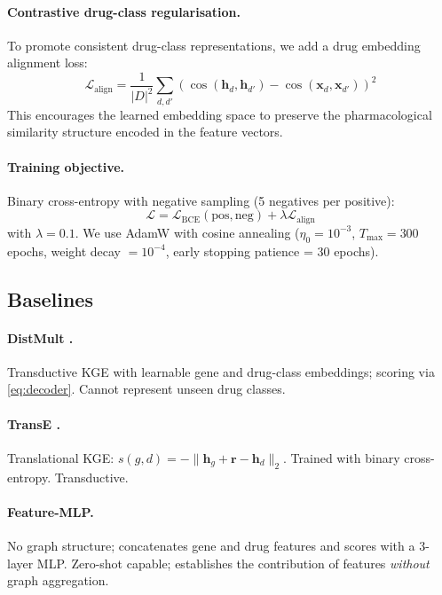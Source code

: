 \documentclass[conference]{IEEEtran}
\begin{document}
\paragraph{Contrastive drug-class regularisation.}
To promote consistent drug-class representations, we add a drug
embedding alignment loss:
\begin{equation}
  \mathcal{L}_{\text{align}} = \frac{1}{|D|^2}
  \sum_{d,d'} \!\left(\cos(\mathbf{h}_d, \mathbf{h}_{d'}) -
    \cos(\mathbf{x}_d, \mathbf{x}_{d'})\right)^2
  \label{eq:align}
\end{equation}
This encourages the learned embedding space to preserve the
pharmacological similarity structure encoded in the feature vectors.

\paragraph{Training objective.}
Binary cross-entropy with negative sampling (5 negatives per positive):
\begin{equation}
  \mathcal{L} = \mathcal{L}_{\text{BCE}}(\text{pos}, \text{neg})
              + \lambda \mathcal{L}_{\text{align}}
\end{equation}
with $\lambda = 0.1$. We use AdamW with cosine annealing
($\eta_0 = 10^{-3}$, $T_{\max} = 300$ epochs, weight decay $= 10^{-4}$,
early stopping patience = 30 epochs).

\subsection{Baselines}

\paragraph{DistMult \cite{Yang2015distmult}.}
Transductive KGE with learnable gene and drug-class embeddings; scoring
via \eqref{eq:decoder}. Cannot represent unseen drug classes.

\paragraph{TransE \cite{Bordes2013transe}.}
Translational KGE: $s(g,d) = -\|\mathbf{h}_g + \mathbf{r} -
\mathbf{h}_d\|_2$. Trained with binary cross-entropy. Transductive.

\paragraph{Feature-MLP.}
No graph structure; concatenates gene and drug features and scores with
a 3-layer MLP. Zero-shot capable; establishes the contribution of
features \emph{without} graph aggregation.
\end{document}

